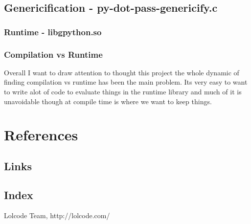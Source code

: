 \documentclass[defaultstyle,11pt]{article}
\begin{document}
\subsection{Genericification - py-dot-pass-genericify.c}

\subsubsection{Runtime - libgpython.so}

\subsubsection{Compilation vs Runtime}
Overall I want to draw attention to thought this project the whole dynamic of finding compilation vs runtime has been the
main problem. Its very easy to want to write alot of code to evaluate things in the runtime library and much of it is unavoidable
though at compile time is where we want to keep things.


\newpage

\section{References}

\subsection{Links}

\subsection{Index}
\printindex


\begin{thebibliography}{9}

	  Lolcode Team,
	  http://lolcode.com/

\end{thebibliography}
\end{document}
